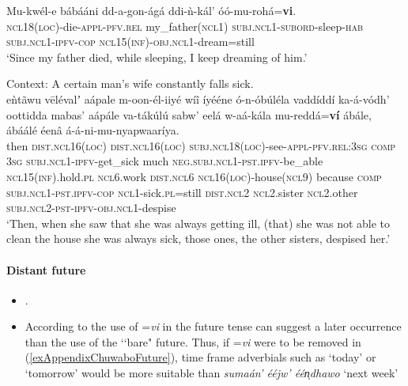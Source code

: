 \begin{exe}
	\ex
	\gll Mu-kwél-e bábááni dd-a-gon-ágá ddi-ǹ-kál' óó-mu-rohá=\textbf{vi}.\\
	\textsc{ncl}18(\textsc{loc})-die-\textsc{appl}-\textsc{pfv}.\textsc{rel} my\_father(\textsc{ncl}1) \textsc{subj}.\textsc{ncl}1-\textsc{subord}-sleep-\textsc{hab} \textsc{subj}.\textsc{ncl}1-\textsc{ipfv}-\textsc{cop} \textsc{ncl}15(\textsc{inf})-\textsc{obj}.\textsc{ncl}1-dream=still\\
	\glt \lq Since my father died, while sleeping, I keep dreaming of him.\rq{ }\parencite[218]{Guerois2015}

	\ex 
	Context: A certain man’s wife constantly falls sick.\\
	\gll eǹtãwu vēlévalʼ aápale m-oon-él-iiyé wíî íyééne ó-n-óbúléla vaddíddí ka-á-vódh' oottidda mabas' aápále va-tákúlú sabw’ eelá w-aá-kála mu-reddá=\textbf{ví} ábále, ábáálé éenâ á-á-ni-mu-nyapwaaríya.\\
	then \textsc{dist}.\textsc{ncl}16(\textsc{loc}) \textsc{dist}.\textsc{ncl}16(\textsc{loc}) \textsc{subj}.\textsc{ncl}18(\textsc{loc})-see-\textsc{appl}-\textsc{pfv}.\textsc{rel}:3\textsc{sg} \textsc{comp} 3\textsc{sg} \textsc{subj}.\textsc{ncl}1-\textsc{ipfv}-get\_sick much \textsc{neg}.\textsc{subj}.\textsc{ncl}1-\textsc{pst}.\textsc{ipfv}-be\_able \textsc{ncl}15(\textsc{inf}).hold.\textsc{pl} \textsc{ncl}6.work \textsc{dist}.\textsc{ncl}6 \textsc{ncl}16(\textsc{loc})-house(\textsc{ncl}9) because \textsc{comp} \textsc{subj}.\textsc{ncl}1-\textsc{pst}.\textsc{ipfv}-\textsc{cop} \textsc{ncl}1-sick.\textsc{pl}=still \textsc{dist}.\textsc{ncl}2 \textsc{ncl}2.sister \textsc{ncl}2.other \textsc{subj}.\textsc{ncl}2-\textsc{pst}-\textsc{ipfv}-\textsc{obj}.\textsc{ncl}1-despise\\
	\glt \lq Then, when she saw that she was always getting ill, (that) she was not able to clean the house she was always sick, those ones, the other sisters, despised her.' \parencite[608]{Guerois2015}
\end{exe}
\pagebreak

\paragraph{Distant future}
\label{appendixChuwabuDistantFuture}
\begin{itemize}
	\item \textcite{Guerois2021}.
	\item According to \textcite{Guerois2021} the use of \mbox{=\textit{vi}} in the future tense can suggest a later occurrence than the use of the \lq\lq bare" future. Thus, if  \mbox{=\textit{vi}}  were to be removed in (\ref{exAppendixChuwaboFuture}), time frame adverbials such as \lq today' or \lq tomorrow' would be more suitable than  \textit{sumaán' ééjw' één̩dhawo} \lq next week'
\end{itemize}

